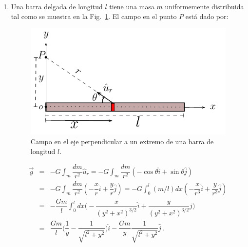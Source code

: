 \begin{enumerate}
\item Una barra delgada de longitud $l$ tiene una masa $m$ uniformemente distribuida tal como se muestra en la Fig.~\ref{fig:gravitacion-barra2}. El campo en el punto $P$ está dado por:
\begin{figure}[h]
\begin{center}
\includegraphics[scale=0.9]{gravitacion/barra2}
\end{center}
\caption{Campo en el eje perpendicular a un extremo de una barra de longitud $l$.}
\label{fig:gravitacion-barra2}
\end{figure}
\begin{eqnarray}
\nonumber \vec{g} & = & -G\int_m \dfrac{dm}{r^2}\hat{u}_r =-G\int_m \dfrac{dm}{r^2} (-\cos\theta \hat{i} + \sin\theta \hat{j})  \\ \nonumber
& = &-G\int_m \dfrac{dm}{r^2} (-\dfrac{x}{r} \hat{i} + \dfrac{y}{r} \hat{j}) 
=-G\int_0^l (m/l)dx(-\dfrac{x}{r^3} \hat{i} + \dfrac{y}{r^3} \hat{j}) \\\nonumber
&= &-\dfrac{Gm}{l}\int_0^l dx\Big(-\dfrac{x}{(y^2+x^2)^{3/2}} \hat{i} + \dfrac{y}{(y^2+x^2)^{3/2}} \hat{j}\Big) \\
&=& \dfrac{Gm}{l}\Big(\dfrac{1}{y}-\dfrac{1}{\sqrt{l^2+y^2}}\Big)\hat{i} -\dfrac{Gm}{y}\dfrac{1}{\sqrt{l^2+y^2}}\hat{j}\,.
\end{eqnarray}


\end{enumerate}
